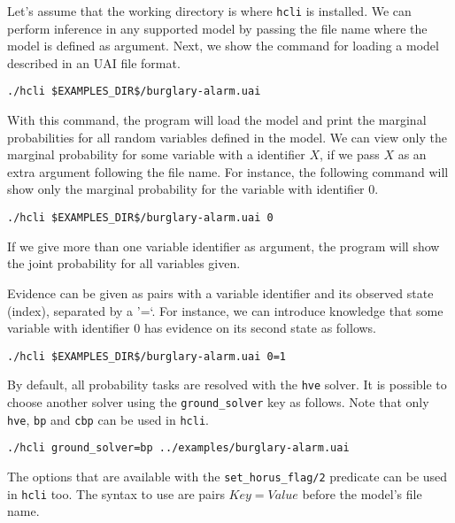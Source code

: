 \documentclass{article}
\begin{document}
Let's assume that the working directory is where \texttt{hcli} is installed. We can perform inference in any supported model by passing the file name where the model is defined as argument. Next, we show the command for loading a model described in an UAI file format.

\begin{verbatim}
./hcli $EXAMPLES_DIR$/burglary-alarm.uai
\end{verbatim}

With this command, the program will load the model and print the marginal probabilities for all random variables defined in the model. We can view only the marginal probability for some variable with a identifier $X$, if we pass $X$ as an extra argument following the file name. For instance, the following command will show only the marginal probability for the variable with identifier $0$.

\begin{verbatim}
./hcli $EXAMPLES_DIR$/burglary-alarm.uai 0
\end{verbatim}

If we give more than one variable identifier as argument, the program will show the joint probability for all variables given.

Evidence can be given as pairs with a variable identifier and its observed state (index), separated by a '=`. For instance, we can introduce knowledge that some variable with identifier $0$ has evidence on its second state as follows.

\begin{verbatim}
./hcli $EXAMPLES_DIR$/burglary-alarm.uai 0=1
\end{verbatim}

By default, all probability tasks are resolved with the \texttt{hve} solver. It is possible to choose another solver using the \texttt{ground\_solver} key as follows. Note that only \texttt{hve}, \texttt{bp} and \texttt{cbp} can be used in \texttt{hcli}.

\begin{verbatim}
./hcli ground_solver=bp ../examples/burglary-alarm.uai
\end{verbatim}

The options that are available with the \texttt{set\_horus\_flag/2} predicate can be used in \texttt{hcli} too. The syntax to use are pairs $Key=Value$ before the model's file name.
\end{document}
